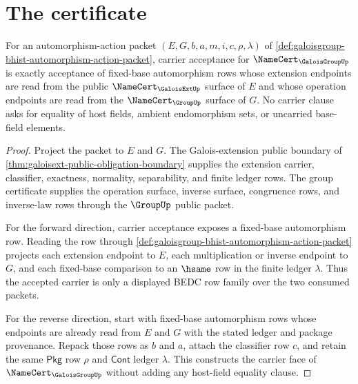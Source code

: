 \section{The certificate}
\label{sec:galoisgroup-certificate}

\begin{theorem}
\label{thm:galoisgroup-fixed-base-carrier-obligation}
For an automorphism-action packet $(E,G,b,a,m,i,c,\rho,\lambda)$ of
\autoref{def:galoisgroup-bhist-automorphism-action-packet}, carrier
acceptance for $\NameCert_{\GaloisGroupUp}$ is exactly acceptance of
fixed-base automorphism rows whose extension endpoints are read from the
public $\NameCert_{\GaloisExtUp}$ surface of $E$ and whose operation endpoints
are read from the $\NameCert_{\GroupUp}$ surface of $G$. No carrier clause
asks for equality of host fields, ambient endomorphism sets, or uncarried
base-field elements.
\end{theorem}
\begin{proof}
Project the packet to $E$ and $G$. The Galois-extension public boundary of
\autoref{thm:galoisext-public-obligation-boundary} supplies the extension
carrier, classifier, exactness, normality, separability, and finite ledger
rows. The group certificate supplies the operation surface, inverse surface,
congruence rows, and inverse-law rows through the $\GroupUp$ public packet.

For the forward direction, carrier acceptance exposes a fixed-base
automorphism row. Reading the row through
\autoref{def:galoisgroup-bhist-automorphism-action-packet} projects each
extension endpoint to $E$, each multiplication or inverse endpoint to $G$, and
each fixed-base comparison to an $\hsame$ row in the finite ledger
$\lambda$. Thus the accepted carrier is only a displayed BEDC row family over
the two consumed packets.

For the reverse direction, start with fixed-base automorphism rows whose
endpoints are already read from $E$ and $G$ with the stated ledger and package
provenance. Repack those rows as $b$ and $a$, attach the classifier row $c$,
and retain the same $\mathsf{Pkg}$ row $\rho$ and $\mathsf{Cont}$ ledger
$\lambda$. This constructs the carrier face of
$\NameCert_{\GaloisGroupUp}$ without adding any host-field equality clause.
\end{proof}

